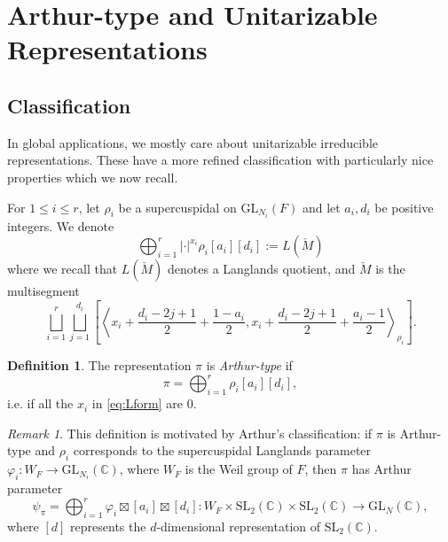 \documentclass{amsart}
\newcommand{\lf}{\left}
\newcommand{\ri}{\right}
\newcommand{\f}{\frac}
\newcommand{\C}{\mathbb C}
\newcommand{\SL}{\mathrm{SL}}
\newcommand{\GL}{\mathrm{GL}}
\newcommand{\1}{\m 1}
\theoremstyle{remark}
\newtheorem{rmk}[thm]{Remark}
\theoremstyle{definition}
\newtheorem{dfn}[thm]{Definition}
\numberwithin{equation}{subsection}
\newcommand{\red}[1]{\textcolor{red}{#1}}
\begin{document}
\section{Arthur-type and Unitarizable Representations}\label{sec:Atype}


\subsection{Classification}
In global applications, we mostly care about unitarizable irreducible representations. These have a more refined classification with particularly nice properties which we now recall.

For $1 \leq i \leq r$, let $\rho_i$ be a supercuspidal on $\GL_{N_i}(F)$ and let $a_i, d_i$ be positive integers. We denote
\begin{equation}\label{eq:Lform}
\bigoplus_{i=1}^r |\cdot|^{x_i} \rho_i[a_i][d_i]:= L(\check M)
\end{equation}
where we recall that $L(\check M)$ denotes a Langlands quotient, and $\check M$ is the multisegment
\begin{equation} \label{eq:Arthur type as Langlands Quotient}
\bigsqcup_{i=1}^r \bigsqcup_{j=1}^{d_i} \lf[\lf\langle x_i + \f{d_i-2j +1}2+ \f{1-a_i}2, x_i + \f{d_i-2j +1}2 +\f{a_i-1}2 \ri\rangle_{\rho_i} \ri].
\end{equation}

\begin{dfn}\label{def:Atype}
The representation $\pi$ is \emph{Arthur-type} if 
\[ 
\pi = \bigoplus_{i=1}^r \rho_i[a_i][d_i],
\]
i.e. if all the $x_i$ in \eqref{eq:Lform} are $0$.
\end{dfn}

\begin{rmk}
This definition is motivated by Arthur's classification: if $\pi$ is Arthur-type 
and $\rho_i$ corresponds to the supercuspidal Langlands parameter $\varphi_i : W_F \to \GL_{N_i}(\C)$, where $W_F$ is the Weil group of $F$, then $\pi$ has Arthur parameter
\[
\psi_\pi  = \bigoplus_{i=1}^r \varphi_i \boxtimes [a_i] \boxtimes [d_i] : W_F \times \SL_2(\C) \times \SL_2(\C) \to \GL_N(\C) ,
\]
where $[d]$ represents the $d$-dimensional representation of $\SL_2(\C)$. 
\end{rmk}
\end{document}

